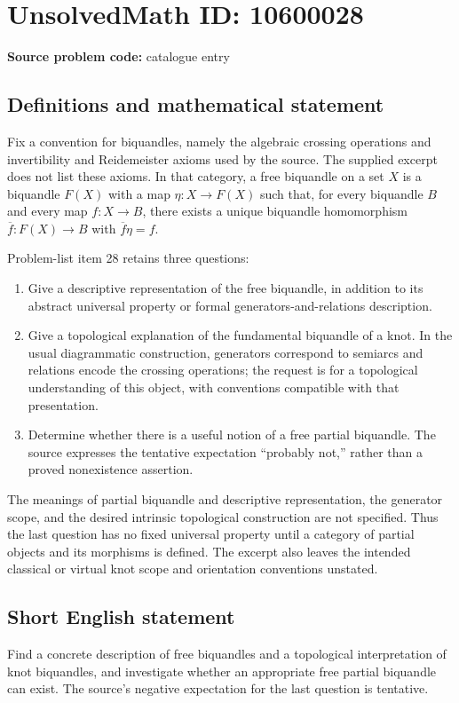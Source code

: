 \documentclass[11pt]{article}
\begin{document}
\section*{UnsolvedMath ID: 10600028}
\textbf{Source problem code:} catalogue entry
\subsection{Definitions and mathematical statement}
Fix a convention for biquandles, namely the algebraic crossing operations and invertibility and Reidemeister axioms used by the source. The supplied excerpt does not list these axioms. In that category, a free biquandle on a set $X$ is a biquandle $F(X)$ with a map $\eta:X\to F(X)$ such that, for every biquandle $B$ and every map $f:X\to B$, there exists a unique biquandle homomorphism $\overline f:F(X)\to B$ with $\overline f\eta=f$.

Problem-list item 28 retains three questions:
\begin{enumerate}
\item Give a descriptive representation of the free biquandle, in addition to its abstract universal property or formal generators-and-relations description.
\item Give a topological explanation of the fundamental biquandle of a knot. In the usual diagrammatic construction, generators correspond to semiarcs and relations encode the crossing operations; the request is for a topological understanding of this object, with conventions compatible with that presentation.
\item Determine whether there is a useful notion of a free partial biquandle. The source expresses the tentative expectation ``probably not,'' rather than a proved nonexistence assertion.
\end{enumerate}
The meanings of partial biquandle and descriptive representation, the generator scope, and the desired intrinsic topological construction are not specified. Thus the last question has no fixed universal property until a category of partial objects and its morphisms is defined. The excerpt also leaves the intended classical or virtual knot scope and orientation conventions unstated.
\subsection{Short English statement}
Find a concrete description of free biquandles and a topological interpretation of knot biquandles, and investigate whether an appropriate free partial biquandle can exist. The source's negative expectation for the last question is tentative.
\end{document}
